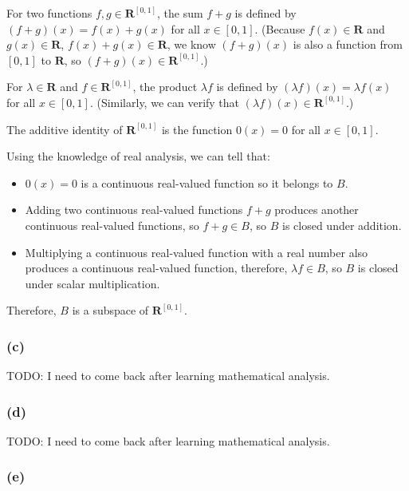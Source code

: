 \documentclass[12pt, letterpaper, oneside]{book}
\begin{document}
For two functions $f, g \in \mathbf{R}^{[0,1]}$, the sum $f + g$ is defined by
$(f + g)(x) = f(x) + g(x)$ for all $x \in [0,1]$. (Because $f(x) \in
\mathbf{R}$ and $g(x) \in \mathbf{R}$, $f(x) + g(x) \in \mathbf{R}$, we know
$(f + g)(x)$ is also a function from $[0,1]$ to $\mathbf{R}$, so $(f + g)(x)
\in \mathbf{R}^{[0,1]}$.)

For $\lambda \in \mathbf{R}$ and $f \in \mathbf{R}^{[0,1]}$, the product
$\lambda f$ is defined by $(\lambda f)(x) = \lambda f(x)$ for all $x \in [0,1]$.
(Similarly, we can verify that $(\lambda f)(x) \in \mathbf{R}^{[0,1]}$.)

The additive identity of $\mathbf{R}^{[0,1]}$ is the function $0(x) = 0$ for
all $x \in [0,1]$.

Using the knowledge of real analysis, we can tell that:
\begin{itemize}
  \item $0(x) = 0$ is a continuous real-valued function so it belongs to $B$.
  \item Adding two continuous real-valued functions $f + g$ produces another
    continuous real-valued functions, so $f + g \in B$, so $B$ is closed under
    addition.
  \item Multiplying a continuous real-valued function with a real number also
    produces a continuous real-valued function, therefore, $\lambda f \in B$,
    so $B$ is closed under scalar multiplication.
\end{itemize}

Therefore, $B$ is a subspace of $\mathbf{R}^{[0,1]}$.

\subsubsection*{(c)}

TODO: I need to come back after learning mathematical analysis.

\subsubsection*{(d)}

TODO: I need to come back after learning mathematical analysis.

\subsubsection*{(e)}
\end{document}
